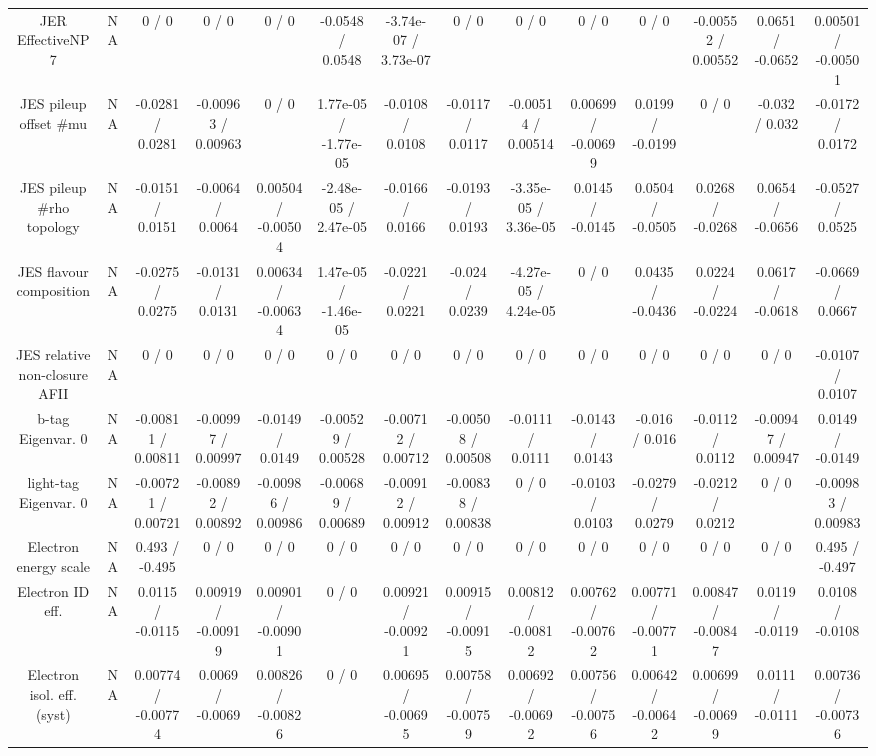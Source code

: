 \documentclass[10pt]{article}
\begin{document}
\begin{table}[htbp]
\begin{center}
\begin{tabular}{|c|c|c|c|c|c|c|c|c|c|c|c|c|c|}
  JER EffectiveNP 7 &    NA    & 0 / 0 & 0 / 0 & 0 / 0 & -0.0548 / 0.0548 & -3.74e-07 / 3.73e-07 & 0 / 0 & 0 / 0 & 0 / 0 & 0 / 0 & -0.00552 / 0.00552 & 0.0651 / -0.0652 & 0.00501 / -0.00501 \\ 
  JES pileup offset #mu &    NA    & -0.0281 / 0.0281 & -0.00963 / 0.00963 & 0 / 0 & 1.77e-05 / -1.77e-05 & -0.0108 / 0.0108 & -0.0117 / 0.0117 & -0.00514 / 0.00514 & 0.00699 / -0.00699 & 0.0199 / -0.0199 & 0 / 0 & -0.032 / 0.032 & -0.0172 / 0.0172 \\ 
  JES pileup #rho topology &    NA    & -0.0151 / 0.0151 & -0.0064 / 0.0064 & 0.00504 / -0.00504 & -2.48e-05 / 2.47e-05 & -0.0166 / 0.0166 & -0.0193 / 0.0193 & -3.35e-05 / 3.36e-05 & 0.0145 / -0.0145 & 0.0504 / -0.0505 & 0.0268 / -0.0268 & 0.0654 / -0.0656 & -0.0527 / 0.0525 \\ 
  JES flavour composition &    NA    & -0.0275 / 0.0275 & -0.0131 / 0.0131 & 0.00634 / -0.00634 & 1.47e-05 / -1.46e-05 & -0.0221 / 0.0221 & -0.024 / 0.0239 & -4.27e-05 / 4.24e-05 & 0 / 0 & 0.0435 / -0.0436 & 0.0224 / -0.0224 & 0.0617 / -0.0618 & -0.0669 / 0.0667 \\ 
  JES relative non-closure AFII &    NA    & 0 / 0 & 0 / 0 & 0 / 0 & 0 / 0 & 0 / 0 & 0 / 0 & 0 / 0 & 0 / 0 & 0 / 0 & 0 / 0 & 0 / 0 & -0.0107 / 0.0107 \\ 
  b-tag Eigenvar. 0 &    NA    & -0.00811 / 0.00811 & -0.00997 / 0.00997 & -0.0149 / 0.0149 & -0.00529 / 0.00528 & -0.00712 / 0.00712 & -0.00508 / 0.00508 & -0.0111 / 0.0111 & -0.0143 / 0.0143 & -0.016 / 0.016 & -0.0112 / 0.0112 & -0.00947 / 0.00947 & 0.0149 / -0.0149 \\ 
  light-tag Eigenvar. 0 &    NA    & -0.00721 / 0.00721 & -0.00892 / 0.00892 & -0.00986 / 0.00986 & -0.00689 / 0.00689 & -0.00912 / 0.00912 & -0.00838 / 0.00838 & 0 / 0 & -0.0103 / 0.0103 & -0.0279 / 0.0279 & -0.0212 / 0.0212 & 0 / 0 & -0.00983 / 0.00983 \\ 
  Electron energy scale &    NA    & 0.493 / -0.495 & 0 / 0 & 0 / 0 & 0 / 0 & 0 / 0 & 0 / 0 & 0 / 0 & 0 / 0 & 0 / 0 & 0 / 0 & 0 / 0 & 0.495 / -0.497 \\ 
  Electron ID eff. &    NA    & 0.0115 / -0.0115 & 0.00919 / -0.00919 & 0.00901 / -0.00901 & 0 / 0 & 0.00921 / -0.00921 & 0.00915 / -0.00915 & 0.00812 / -0.00812 & 0.00762 / -0.00762 & 0.00771 / -0.00771 & 0.00847 / -0.00847 & 0.0119 / -0.0119 & 0.0108 / -0.0108 \\ 
  Electron isol. eff. (syst) &    NA    & 0.00774 / -0.00774 & 0.0069 / -0.0069 & 0.00826 / -0.00826 & 0 / 0 & 0.00695 / -0.00695 & 0.00758 / -0.00759 & 0.00692 / -0.00692 & 0.00756 / -0.00756 & 0.00642 / -0.00642 & 0.00699 / -0.00699 & 0.0111 / -0.0111 & 0.00736 / -0.00736 \\ 

\end{tabular}
\end{center}
\end{table}
\end{document}
